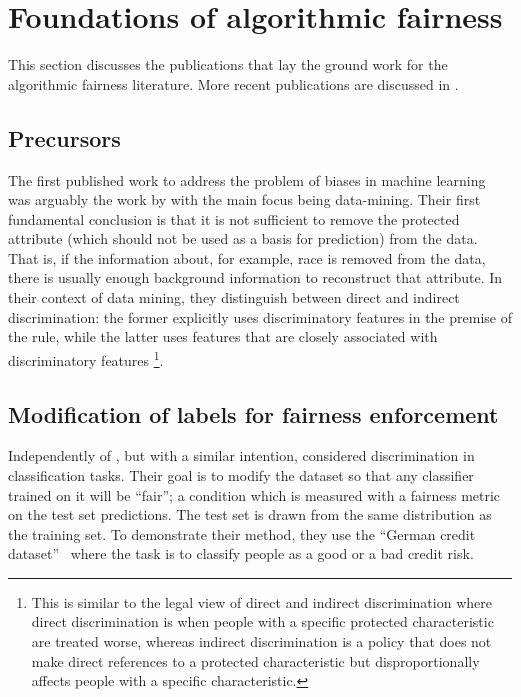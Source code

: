 \section{Foundations of algorithmic fairness}\label{sec:foundations}
This section discusses the publications that lay the ground work for the algorithmic fairness literature.
More recent publications are discussed in %
.

\subsection{Precursors}\label{precursor}
The first published work to address the problem of biases in machine learning
was arguably the work by \citet{pedreshi2008discrimination}
with the main focus being data-mining.
Their first fundamental conclusion
is that it is not sufficient to remove the protected attribute
(which should not be used as a basis for prediction) from the data.
That is, if the information about, for example, race
is removed from the data,
there is usually enough background information to reconstruct that attribute.
In their context of data mining,
they distinguish between direct and indirect discrimination:
the former explicitly uses discriminatory features in the premise of the rule,
while the latter uses features that are closely associated with discriminatory features%
\footnote{This is similar to the legal view of direct and indirect discrimination
where direct discrimination is when people with a specific protected characteristic are treated worse,
whereas indirect discrimination is a policy that does not make direct references to a protected characteristic
but disproportionally affects people with a specific characteristic.}.

\subsection{Modification of labels for fairness enforcement}%
\label{modification-of-labels-for-fairness-enforcement}
Independently of \citet{pedreshi2008discrimination}, but with a similar intention,
\citet{kamiran2009classifying} considered discrimination in classification tasks.
Their goal is to modify the dataset so that any classifier trained on it will be ``fair'';
a condition which is measured with a fairness metric on the test set predictions.
The test set is drawn from the same distribution as the training set.
To demonstrate their method, they use the ``German credit dataset''~\citep{Dua:2017}
where the task is to classify people as a good or a bad credit risk.

